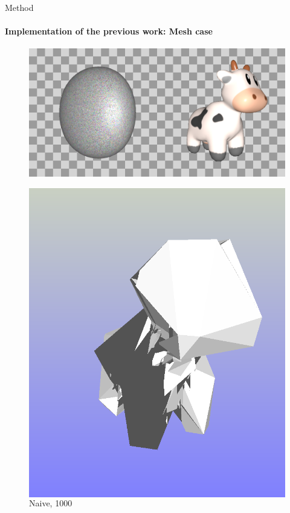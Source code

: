 \documentclass[beamer]{standalone}
\begin{document}
\begin{frame}{Method}
    \framesubtitle{Implementation of the previous work: Mesh case}

        \begin{figure}
            \includegraphics[width=0.25\linewidth]{./figures/spot.png}
        \end{figure}

        \begin{figure}
            \centering
            \begin{columns}[t]
                    \includegraphics[width=\linewidth]{./figures/spot-raw.png}
                    \caption{Naive, 1000}


\end{columns}
\end{figure}
\end{frame}
\end{document}
